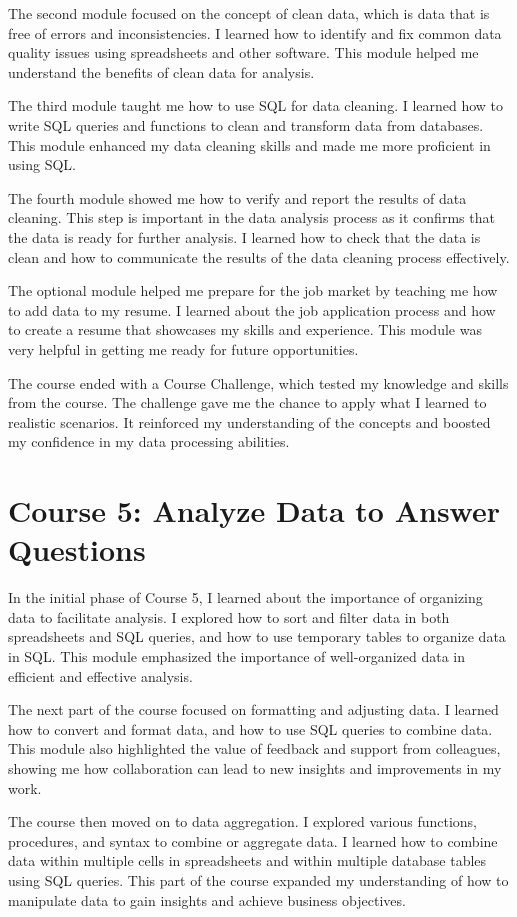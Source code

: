 \documentclass[]{article}
\begin{document}
The second module focused on the concept of clean data, which is data that is free of errors and inconsistencies. I learned how to identify and fix common data quality issues using spreadsheets and other software. This module helped me understand the benefits of clean data for analysis.

The third module taught me how to use SQL for data cleaning. I learned how to write SQL queries and functions to clean and transform data from databases. This module enhanced my data cleaning skills and made me more proficient in using SQL.

The fourth module showed me how to verify and report the results of data cleaning. This step is important in the data analysis process as it confirms that the data is ready for further analysis. I learned how to check that the data is clean and how to communicate the results of the data cleaning process effectively.

The optional module helped me prepare for the job market by teaching me how to add data to my resume. I learned about the job application process and how to create a resume that showcases my skills and experience. This module was very helpful in getting me ready for future opportunities.

The course ended with a Course Challenge, which tested my knowledge and skills from the course. The challenge gave me the chance to apply what I learned to realistic scenarios. It reinforced my understanding of the concepts and boosted my confidence in my data processing abilities.
\section{Course 5: Analyze Data to Answer Questions}
In the initial phase of Course 5, I learned about the importance of organizing data to facilitate analysis. I explored how to sort and filter data in both spreadsheets and SQL queries, and how to use temporary tables to organize data in SQL. This module emphasized the importance of well-organized data in efficient and effective analysis.

The next part of the course focused on formatting and adjusting data. I learned how to convert and format data, and how to use SQL queries to combine data. This module also highlighted the value of feedback and support from colleagues, showing me how collaboration can lead to new insights and improvements in my work.

The course then moved on to data aggregation. I explored various functions, procedures, and syntax to combine or aggregate data. I learned how to combine data within multiple cells in spreadsheets and within multiple database tables using SQL queries. This part of the course expanded my understanding of how to manipulate data to gain insights and achieve business objectives.
\end{document}
